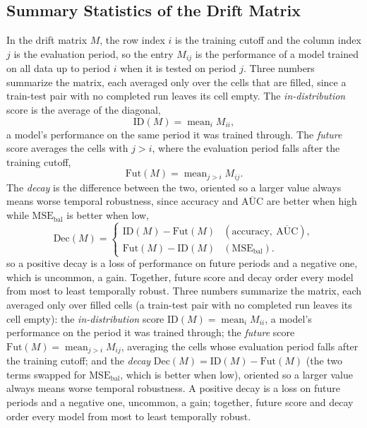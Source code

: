 \subsection{Summary Statistics of the Drift Matrix}
\label{subsec:drift_summary}

In the drift matrix $M$, the row index $i$ is the training cutoff and the column index $j$ is the evaluation period, so the entry $M_{ij}$ is the performance of a model trained on all data up to period $i$ when it is tested on period $j$.
\ifverbosemath
Three numbers summarize the matrix, each averaged only over the cells that are filled, since a train-test pair with no completed run leaves its cell empty. The \emph{in-distribution} score is the average of the diagonal,
\begin{equation}
    \mathrm{ID}(M) = \operatorname{mean}_{i} M_{ii},
    \label{eq:in_distribution}
\end{equation}
a model's performance on the same period it was trained through. The \emph{future} score averages the cells with $j > i$, where the evaluation period falls after the training cutoff,
\begin{equation}
    \mathrm{Fut}(M) = \operatorname{mean}_{j > i} M_{ij}.
    \label{eq:future}
\end{equation}
The \emph{decay} is the difference between the two, oriented so a larger value always means worse temporal robustness, since accuracy and $\overline{\text{AUC}}$ are better when high while $\text{MSE}_{\text{bal}}$ is better when low,
\begin{equation}
    \mathrm{Dec}(M) =
    \begin{cases}
        \mathrm{ID}(M) - \mathrm{Fut}(M) & (\text{accuracy},\ \overline{\text{AUC}}),\\
        \mathrm{Fut}(M) - \mathrm{ID}(M) & (\text{MSE}_{\text{bal}}).
    \end{cases}
    \label{eq:decay}
\end{equation}
so a positive decay is a loss of performance on future periods and a negative one, which is uncommon, a gain. Together, future score and decay order every model from most to least temporally robust.
\else
Three numbers summarize the matrix, each averaged only over filled cells (a train-test pair with no completed run leaves its cell empty): the \emph{in-distribution} score $\mathrm{ID}(M) = \operatorname{mean}_{i} M_{ii}$, a model's performance on the period it was trained through; the \emph{future} score $\mathrm{Fut}(M) = \operatorname{mean}_{j > i} M_{ij}$, averaging the cells whose evaluation period falls after the training cutoff; and the \emph{decay} $\mathrm{Dec}(M) = \mathrm{ID}(M) - \mathrm{Fut}(M)$ (the two terms swapped for $\text{MSE}_{\text{bal}}$, which is better when low), oriented so a larger value always means worse temporal robustness. A positive decay is a loss on future periods and a negative one, uncommon, a gain; together, future score and decay order every model from most to least temporally robust.
\fi

